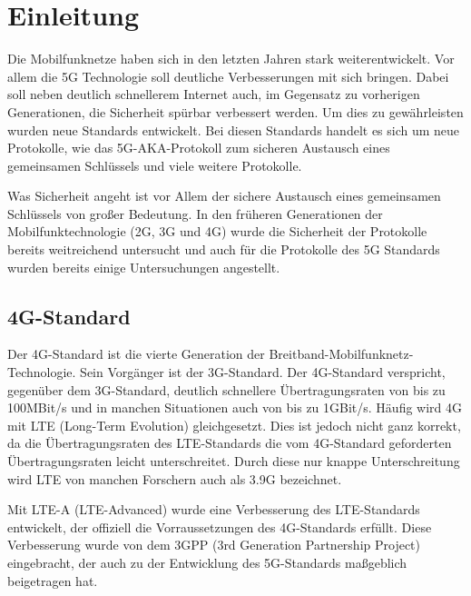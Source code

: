 \chapter{Einleitung}
\label{chap:1}

Die Mobilfunknetze haben sich in den letzten Jahren stark weiterentwickelt. %
Vor allem die 5G Technologie soll deutliche Verbesserungen mit sich bringen. 
Dabei soll neben deutlich schnellerem Internet auch, im Gegensatz zu vorherigen Generationen, die Sicherheit spürbar verbessert werden.
Um dies zu gewährleisten wurden neue Standards entwickelt. 
Bei diesen Standards handelt es sich um neue Protokolle, wie das 5G-AKA-Protokoll zum sicheren Austausch eines gemeinsamen Schlüssels und viele weitere Protokolle.

Was Sicherheit angeht ist vor Allem der sichere Austausch eines gemeinsamen Schlüssels von großer Bedeutung. 
In den früheren Generationen der Mobilfunktechnologie (2G, 3G und 4G) wurde die Sicherheit der Protokolle bereits weitreichend untersucht und auch für die Protokolle des 5G Standards wurden bereits einige Untersuchungen angestellt. %


\section{4G-Standard}
Der 4G-Standard ist die vierte Generation der Breitband-Mobilfunknetz-Technologie. %
Sein Vorgänger ist der 3G-Standard. 
Der 4G-Standard verspricht, gegenüber dem 3G-Standard, deutlich schnellere Übertragungsraten von bis zu 100MBit/s und in manchen Situationen auch von bis zu 1GBit/s. %
Häufig wird 4G mit LTE (Long-Term Evolution) gleichgesetzt. %
Dies ist jedoch nicht ganz korrekt, da die Übertragungsraten des LTE-Standards die vom 4G-Standard geforderten Übertragungsraten leicht unterschreitet. 
Durch diese nur knappe Unterschreitung wird LTE von manchen Forschern auch als 3.9G bezeichnet. %

Mit LTE-A (LTE-Advanced) wurde eine Verbesserung des LTE-Standards entwickelt, der offiziell die Vorraussetzungen des 4G-Standards erfüllt. %
Diese Verbesserung wurde von dem 3GPP (3rd Generation Partnership Project) eingebracht, der auch zu der Entwicklung des 5G-Standards maßgeblich beigetragen hat. %


